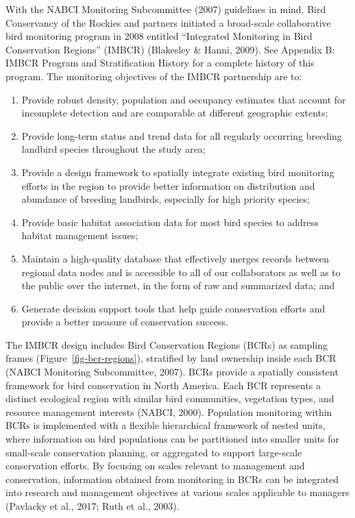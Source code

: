 \documentclass[
  letterpaper,
  DIV=11,
  numbers=noendperiod,
  oneside]{scrreprt}
\providecommand{\tightlist}{%
  \setlength{\itemsep}{0pt}\setlength{\parskip}{0pt}}\usepackage{longtable,booktabs,array}
\begin{document}
With the NABCI Monitoring Subcommittee (2007) guidelines in mind, Bird
Conservancy of the Rockies and partners initiated a broad-scale
collaborative bird monitoring program in 2008 entitled ``Integrated
Monitoring in Bird Conservation Regions'' (IMBCR) (Blakesley \& Hanni,
2009). See Appendix B: IMBCR Program and Stratification History for a
complete history of this program. The monitoring objectives of the IMBCR
partnership are to:

\begin{enumerate}
\def\labelenumi{\arabic{enumi}.}
\tightlist
\item
  Provide robust density, population and occupancy estimates that
  account for incomplete detection and are comparable at different
  geographic extents;
\item
  Provide long-term status and trend data for all regularly occurring
  breeding landbird species throughout the study area;
\item
  Provide a design framework to spatially integrate existing bird
  monitoring efforts in the region to provide better information on
  distribution and abundance of breeding landbirds, especially for high
  priority species;
\item
  Provide basic habitat association data for most bird species to
  address habitat management issues;
\item
  Maintain a high-quality database that effectively merges records
  between regional data nodes and is accessible to all of our
  collaborators as well as to the public over the internet, in the form
  of raw and summarized data; and
\item
  Generate decision support tools that help guide conservation efforts
  and provide a better measure of conservation success.
\end{enumerate}

The IMBCR design includes Bird Conservation Regions (BCRs) as sampling
frames (Figure~\ref{fig-bcr-regions}), stratified by land ownership
inside each BCR (NABCI Monitoring Subcommittee, 2007). BCRs provide a
spatially consistent framework for bird conservation in North America.
Each BCR represents a distinct ecological region with similar bird
communities, vegetation types, and resource management interests (NABCI,
2000). Population monitoring within BCRs is implemented with a flexible
hierarchical framework of nested units, where information on bird
populations can be partitioned into smaller units for small-scale
conservation planning, or aggregated to support large-scale conservation
efforts. By focusing on scales relevant to management and conservation,
information obtained from monitoring in BCRs can be integrated into
research and management objectives at various scales applicable to
managers (Pavlacky et al., 2017; Ruth et al., 2003).
\end{document}
